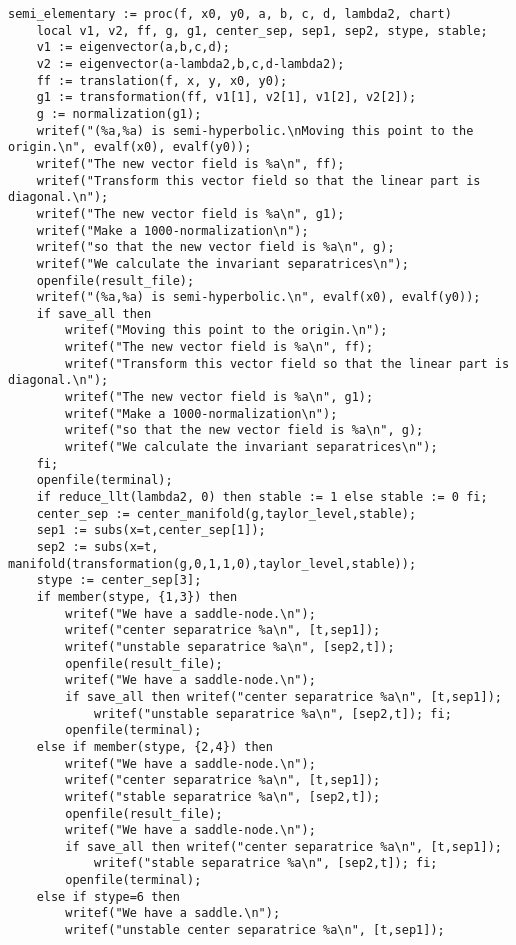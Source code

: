 \documentclass[a4paper,10pt]{article}
\begin{document}
\begin{lstlisting}[name=type]
semi_elementary := proc(f, x0, y0, a, b, c, d, lambda2, chart)
    local v1, v2, ff, g, g1, center_sep, sep1, sep2, stype, stable;
    v1 := eigenvector(a,b,c,d);
    v2 := eigenvector(a-lambda2,b,c,d-lambda2);
    ff := translation(f, x, y, x0, y0);
    g1 := transformation(ff, v1[1], v2[1], v1[2], v2[2]);
    g := normalization(g1);
    writef("(%a,%a) is semi-hyperbolic.\nMoving this point to the origin.\n", evalf(x0), evalf(y0));
    writef("The new vector field is %a\n", ff);
    writef("Transform this vector field so that the linear part is diagonal.\n");
    writef("The new vector field is %a\n", g1);
    writef("Make a 1000-normalization\n");
    writef("so that the new vector field is %a\n", g);
    writef("We calculate the invariant separatrices\n");
    openfile(result_file);
    writef("(%a,%a) is semi-hyperbolic.\n", evalf(x0), evalf(y0));
    if save_all then
        writef("Moving this point to the origin.\n");
        writef("The new vector field is %a\n", ff);
        writef("Transform this vector field so that the linear part is diagonal.\n");
        writef("The new vector field is %a\n", g1);
        writef("Make a 1000-normalization\n");
        writef("so that the new vector field is %a\n", g);
        writef("We calculate the invariant separatrices\n");
    fi;
    openfile(terminal);
    if reduce_llt(lambda2, 0) then stable := 1 else stable := 0 fi;
    center_sep := center_manifold(g,taylor_level,stable);
    sep1 := subs(x=t,center_sep[1]);
    sep2 := subs(x=t, manifold(transformation(g,0,1,1,0),taylor_level,stable));
    stype := center_sep[3];
    if member(stype, {1,3}) then
        writef("We have a saddle-node.\n");
        writef("center separatrice %a\n", [t,sep1]);
        writef("unstable separatrice %a\n", [sep2,t]);
        openfile(result_file);
        writef("We have a saddle-node.\n");
        if save_all then writef("center separatrice %a\n", [t,sep1]);
            writef("unstable separatrice %a\n", [sep2,t]); fi;
        openfile(terminal);
    else if member(stype, {2,4}) then
        writef("We have a saddle-node.\n");
        writef("center separatrice %a\n", [t,sep1]);
        writef("stable separatrice %a\n", [sep2,t]);
        openfile(result_file);
        writef("We have a saddle-node.\n");
        if save_all then writef("center separatrice %a\n", [t,sep1]);
            writef("stable separatrice %a\n", [sep2,t]); fi;
        openfile(terminal);
    else if stype=6 then
        writef("We have a saddle.\n");
        writef("unstable center separatrice %a\n", [t,sep1]);

\end{lstlisting}
\end{document}
